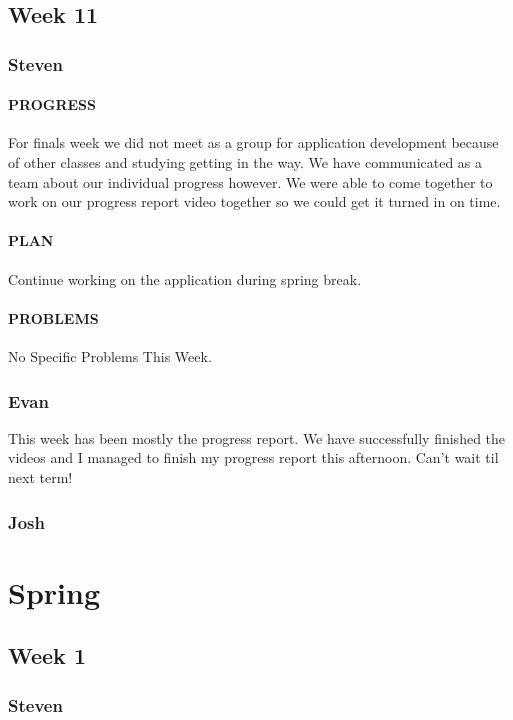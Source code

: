 \documentclass[onecolumn, draftclsnofoot,10pt, compsoc]{IEEEtran}
\begin{document}
\subsection{Week 11}
	\subsubsection{Steven}
	\paragraph{PROGRESS}
	For finals week we did not meet as a group for application development because of other classes and studying getting in the way. We have communicated as a team about our individual progress however. We were able to come together to work on our progress report video together so we could get it turned in on time.
	
	\paragraph{PLAN}
	Continue working on the application during spring break.
	
	\paragraph{PROBLEMS}
	No Specific Problems This Week.
	
	\subsubsection{Evan}
	This week has been mostly the progress report. We have successfully finished the videos and I managed to finish my progress report this afternoon. Can't wait til next term!
	
	\subsubsection{Josh}

\section{Spring}
\subsection{Week 1}
	\subsubsection{Steven}
	
\end{document}
